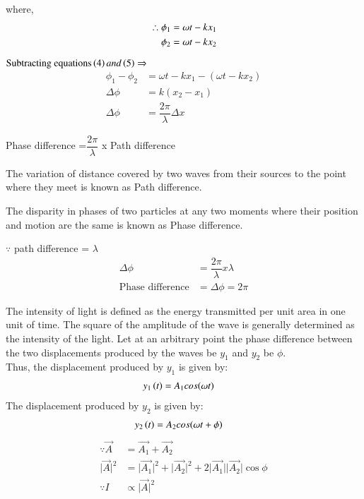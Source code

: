 \documentclass[journal,12pt,twocolumn]{IEEEtran}
\theoremstyle{remark}
\begin{document}
where,
\begin{align}
 \therefore \phi_1 &= \omega t - kx_1 \\
\hspace*{0.4cm} \phi_2 &= \omega t - kx_2 
\end{align}

$ \text{Subtracting equations}\left(4\right) and \left(5\right)  \Rightarrow{}$
\begin{align}
   \phi_1 - \phi_2 &= \omega t - kx_1 -( \omega t - kx_2 ) \nonumber \\ 
   \Delta \phi &= k(x_2 - x_1) \nonumber \\ 
    \Delta \phi &= \dfrac{2\pi}{\lambda}\Delta x 
\end{align}

\hspace{0.3cm} Phase difference =$\dfrac{2\pi}{\lambda}$ x Path difference

\vspace{0.2cm}

The variation of distance covered by two waves from their sources to the point where they meet is known as Path difference.

The disparity in phases of two particles at any two moments where their position and motion are the same is known as Phase difference.

$\because$ path difference = $\lambda$
\begin{align}
\Delta \phi &= \dfrac{2\pi}{\lambda}  x  \lambda \nonumber \\
\text{Phase difference} &= \Delta \phi = 2\pi
\end{align}

The intensity of light is defined as the energy transmitted per unit area in one unit of time. The square of the amplitude of the wave is generally determined as the intensity of the light. 
Let at an arbitrary point the phase difference between the two displacements produced by the waves be $y_1$ and $y_2$ be $\phi$.\\
Thus, the displacement produced by $y_1$ is given by:\
\begin{align}
    y_1\left(t\right) &= A_1cos(\omega t )
\end{align}
The displacement produced by $y_2$ is given by:
\begin{align}
    y_2\left(t\right) &= A_2cos(\omega t + \phi)
\end{align}
\begin{align}
 \because \overrightarrow{A} &= \overrightarrow{A_1} + \overrightarrow{A_2} \nonumber \\
 \lvert \overrightarrow{A} \rvert^2 &= \lvert\overrightarrow{A_1}\rvert^2 +\lvert \overrightarrow{A_2}\rvert^2 + 2\lvert\overrightarrow{A_1}\rvert\lvert\overrightarrow{A_2}\rvert \cos \phi  \\
\because I &\propto \lvert\overrightarrow{A}\rvert^2 
\end{align}
\end{document}
